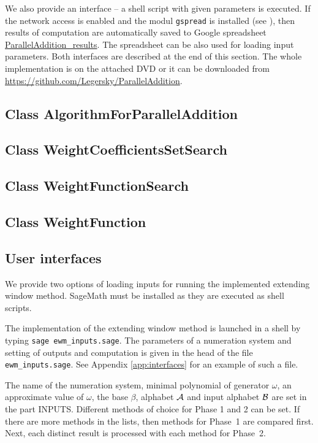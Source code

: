 We also provide an interface -- a shell script with given parameters is executed. If the network access is enabled and the modul \verb+gspread+ is installed (see \cite{gspread}), then results of computation are automatically saved to Google spreadsheet \href{https://docs.google.com/spreadsheets/d/1TnhrHdefHfHa0WSeVs4q6XVj3epjPlPlnoekE0E1xeM/edit?usp=sharing}{ParallelAddition\_results}. The spreadsheet can be also used for loading input parameters. Both interfaces are described at the end of this section. The whole implementation is on the attached DVD or it can be downloaded from  \url{https://github.com/Legersky/ParallelAddition}.



\subsection*{Class AlgorithmForParallelAddition}



\subsection*{Class WeightCoefficientsSetSearch}



\subsection*{Class WeightFunctionSearch}



\subsection*{Class WeightFunction}



\subsection*{User interfaces}
We provide two options of loading inputs for running the implemented extending window method. SageMath must be installed as they are executed as shell scripts.

The implementation of the extending window method is launched in a shell by typing \verb+sage ewm_inputs.sage+. The parameters of a numeration system and setting of outputs and computation is given in the head of the file \verb+ewm_inputs.sage+. See Appendix \ref{app:interfaces} for an example of such a file.


The name of the numeration system, minimal polynomial of generator $\omega$, an approximate value of $\omega$, the base $\beta$, alphabet $\mathcal{A}$ and input alphabet $\mathcal{B}$ are set in the part INPUTS. Different methods of choice for Phase 1 and 2 can be set. If there are more methods in the lists, then methods for Phase~1 are compared first. Next, each distinct result is processed with each method for Phase~2.  

